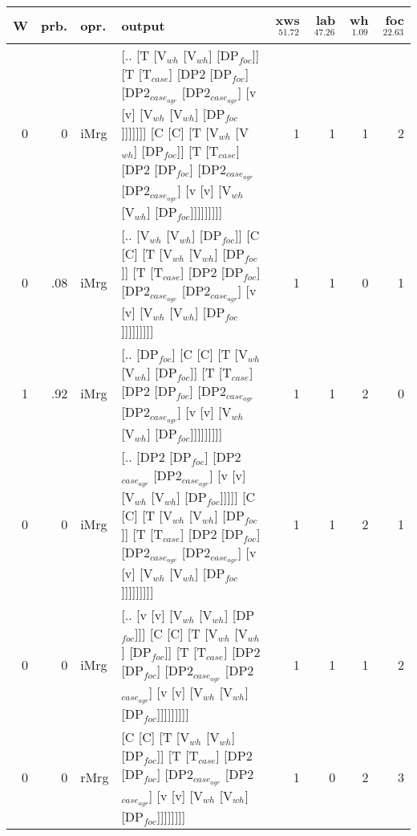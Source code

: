 \begin{tabularx}{\linewidth}{rrlXrrrr}
\hline
   W &   prb. & opr.   & output                                                                                                                                                                                                                                               &   xws$^{51.72}$ &   lab$^{47.26}$ &   wh$^{1.09}$ &   foc$^{22.63}$ \\
\hline
   0 &   0 & iMrg & [.. [T [V$_{wh}$ [V$_{wh}$] [DP$_{foc}$]] [T [T$_{case}$] [DP2 [DP$_{foc}$] [DP2$_{case_{agr}}$ [DP2$_{case_{agr}}$] [v [v] [V$_{wh}$ [V$_{wh}$] [DP$_{foc}$]]]]]]] [C [C] [T [V$_{wh}$ [V$_{wh}$] [DP$_{foc}$]] [T [T$_{case}$] [DP2 [DP$_{foc}$] [DP2$_{case_{agr}}$ [DP2$_{case_{agr}}$] [v [v] [V$_{wh}$ [V$_{wh}$] [DP$_{foc}$]]]]]]]]] &             1 &             1 &            1 &             2 \\
   0 &   .08 & iMrg & [.. [V$_{wh}$ [V$_{wh}$] [DP$_{foc}$]] [C [C] [T [V$_{wh}$ [V$_{wh}$] [DP$_{foc}$]] [T [T$_{case}$] [DP2 [DP$_{foc}$] [DP2$_{case_{agr}}$ [DP2$_{case_{agr}}$] [v [v] [V$_{wh}$ [V$_{wh}$] [DP$_{foc}$]]]]]]]]]                                                                                              &             1 &             1 &            0 &             1 \\
   1 &   .92 & iMrg & [.. [DP$_{foc}$] [C [C] [T [V$_{wh}$ [V$_{wh}$] [DP$_{foc}$]] [T [T$_{case}$] [DP2 [DP$_{foc}$] [DP2$_{case_{agr}}$ [DP2$_{case_{agr}}$] [v [v] [V$_{wh}$ [V$_{wh}$] [DP$_{foc}$]]]]]]]]]                                                                                                            &             1 &             1 &            2 &             0 \\
   0 &   0 & iMrg & [.. [DP2 [DP$_{foc}$] [DP2$_{case_{agr}}$ [DP2$_{case_{agr}}$] [v [v] [V$_{wh}$ [V$_{wh}$] [DP$_{foc}$]]]]] [C [C] [T [V$_{wh}$ [V$_{wh}$] [DP$_{foc}$]] [T [T$_{case}$] [DP2 [DP$_{foc}$] [DP2$_{case_{agr}}$ [DP2$_{case_{agr}}$] [v [v] [V$_{wh}$ [V$_{wh}$] [DP$_{foc}$]]]]]]]]]                                         &             1 &             1 &            2 &             1 \\
   0 &   0 & iMrg & [.. [v [v] [V$_{wh}$ [V$_{wh}$] [DP$_{foc}$]]] [C [C] [T [V$_{wh}$ [V$_{wh}$] [DP$_{foc}$]] [T [T$_{case}$] [DP2 [DP$_{foc}$] [DP2$_{case_{agr}}$ [DP2$_{case_{agr}}$] [v [v] [V$_{wh}$ [V$_{wh}$] [DP$_{foc}$]]]]]]]]]                                                                                      &             1 &             1 &            1 &             2 \\
   0 &   0 & rMrg & [C [C] [T [V$_{wh}$ [V$_{wh}$] [DP$_{foc}$]] [T [T$_{case}$] [DP2 [DP$_{foc}$] [DP2$_{case_{agr}}$ [DP2$_{case_{agr}}$] [v [v] [V$_{wh}$ [V$_{wh}$] [DP$_{foc}$]]]]]]]]                                                                                                                          &             1 &             0 &            2 &             3 \\
\hline
\end{tabularx}\endgroup\\
